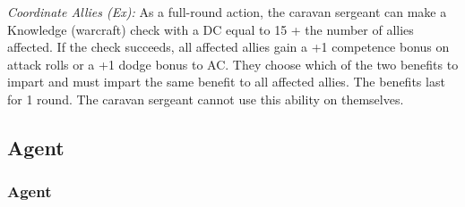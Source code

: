 \textit{Coordinate Allies (Ex):} As a full-round action, the caravan sergeant can make a Knowledge (warcraft) check with a DC equal to 15 + the number of allies affected. If the check succeeds, all affected allies gain a +1 competence bonus on attack rolls or a +1 dodge bonus to AC. They choose which of the two benefits to impart and must impart the same benefit to all affected allies. The benefits last for 1 round. The caravan sergeant cannot use this ability on themselves.

\subsection{Agent}

\subsubsection{Agent}
